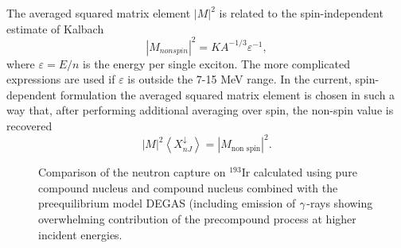 The averaged squared matrix element $|M|^{2}$ is related to the
spin-independent estimate of Kalbach \cite{Kalbach} 
\begin{equation}
|M_{nonspin}|^{2}=KA^{-1/3}\varepsilon ^{-1},
\end{equation}%
\noindent where $\varepsilon =E/n$ is the energy per single exciton. The
more complicated expressions \cite{Kalbach} are used if $\varepsilon $ is
outside the 7-15 MeV range. In the current, spin-dependent formulation the
averaged squared matrix element is chosen in such a way that, after
performing additional averaging over spin, the non-spin value is recovered 
\begin{equation}
|M|^{2}\left\langle X_{nJ}^{\downarrow }\right\rangle =|M_{\text{non spin}%
}|^{2}.
\end{equation}%
\begin{figure}[tbph]
\caption{Comparison of the neutron capture on $^{193}$Ir calculated using
pure compound nucleus and compound nucleus combined with the preequilibrium
model DEGAS (including emission of $\protect\gamma $-rays showing
overwhelming contribution of the precompound process at higher incident
energies. }
\label{ir193}
\end{figure}

